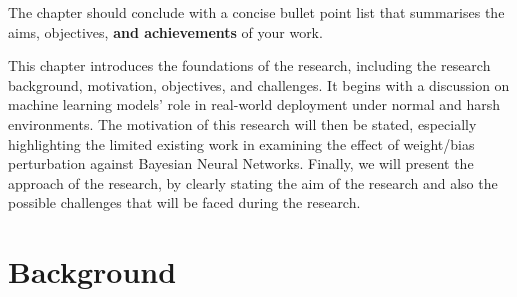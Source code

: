 \documentclass[ %
                    author={Revalda Putawara},
                supervisor={Dr. James Pope},
                    degree={MSc},
                     title={Robustness of Bayesian Neural Networks Design Choices Against Weight and Bias Perturbation Induced by Single Event Upsets (SEUs)},
                      type={},
                      year={2025}]{dissertation}
\begin{document}
The chapter should conclude with a concise bullet point list that 
summarises the aims, objectives, {\bf and achievements}\/ of your work. 

\noindent\makebox[\linewidth]{\rule{\paperwidth}{0.4pt}}
\fi


This chapter introduces the foundations of the research, including the research background, motivation, objectives, and challenges. It begins with a discussion on machine learning models' role in real-world deployment under normal and harsh environments. The motivation of this research will then be stated, especially highlighting the limited existing work in examining the effect of weight/bias perturbation against Bayesian Neural Networks. Finally, we will present the approach of the research, by clearly stating the aim of the research and also the possible challenges that will be faced during the research.

\section{Background} %

\end{document}
